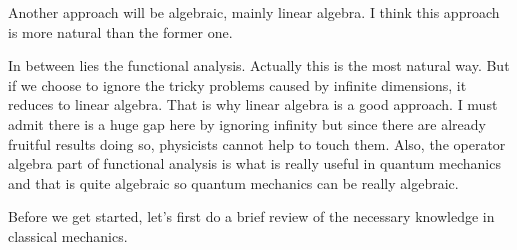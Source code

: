 Another approach will be algebraic, mainly linear algebra. I think this approach is more natural than the former one.

In between lies the functional analysis. Actually this is the most natural way. But if we choose to ignore the tricky problems caused by infinite dimensions, it reduces to linear algebra. That is why linear algebra is a good approach. I must admit there is a huge gap here by ignoring infinity but since there are already fruitful results doing so, physicists cannot help to touch them. Also, the operator algebra part of functional analysis is what is really useful in quantum mechanics and that is quite algebraic so quantum mechanics can be really algebraic.

Before we get started, let's first do a brief review of the necessary knowledge in classical mechanics.